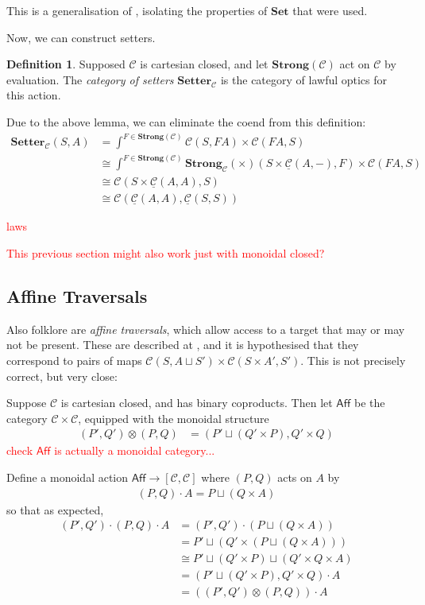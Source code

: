 \documentclass[11pt,a4paper]{article}
\theoremstyle{plain}
\theoremstyle{definition}
\newtheorem{definition}[theorem]{Definition}
\newcommand{\C}{\mathscr{C}}
\newcommand{\homC}{\underline{\C}}
\newcommand{\Set}{\mathbf{Set}}
\newcommand{\Setter}{\mathbf{Setter}}
\newcommand{\Strong}{\mathbf{Strong}}
\newcommand{\todo}[1]{\textcolor{red}{\small #1}}
\begin{document}
This is a generalisation of \cite[Proposition 2.2]{SecondOrderFunctionals}, isolating the properties of $\Set$ that were used.

Now, we can construct setters. 

\begin{definition}
Supposed $\C$ is cartesian closed, and let $\Strong(\C)$ act on $\C$ by evaluation. The \emph{category of setters} $\Setter_\C$ is the category of lawful optics for this action.
\end{definition}

Due to the above lemma, we can eliminate the coend from this definition:
\begin{align*}
\Setter_\C(S, A) &= \int^{F \in \Strong(\C)} \C(S, FA) \times \C(FA, S) \\
&\cong \int^{F \in \Strong(\C)} \Strong_\C(\times)(S \times \homC(A, -), F)  \times \C(FA, S) \\
&\cong \C(S \times \homC(A, A), S) \\
&\cong \C(\homC(A, A), \homC(S,S))
\end{align*}

\todo{laws}

\todo{This previous section might also work just with monoidal closed?}

\subsection{Affine Traversals}

Also folklore are \emph{affine traversals}, which allow access to a target that may or may not be present. These are described at \cite{AffineTraversalPost}, and it is hypothesised that they correspond to pairs of maps $\C(S, A \sqcup S') \times \C(S\times A', S')$. This is not precisely correct, but very close:

Suppose $\C$ is cartesian closed, and has binary coproducts. Then let $\mathsf{Aff}$ be the category $\C \times \C$, equipped with the monoidal structure
\begin{align*}
(P', Q') \otimes (P, Q) &= (P' \sqcup (Q' \times P) , Q' \times Q)
\end{align*}
\todo{check $\mathsf{Aff}$ is actually a monoidal category...}

Define a monoidal action $\mathsf{Aff} \to [\C, \C]$ where $(P, Q)$ acts on $A$ by
\begin{align*}
(P, Q) \cdot A = P \sqcup (Q \times A)
\end{align*}
so that as expected,
\begin{align*}
(P', Q') \cdot (P, Q) \cdot A 
&= (P', Q') \cdot  (P \sqcup (Q \times A)) \\
&= P' \sqcup (Q' \times (P \sqcup (Q \times A))) \\
&\cong P' \sqcup (Q' \times P) \sqcup (Q' \times Q \times A) \\
&= (P' \sqcup (Q' \times P) , Q' \times Q) \cdot A \\
&= ((P', Q') \otimes (P, Q)) \cdot A
\end{align*}
\end{document}
